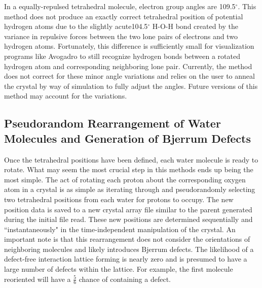 In a equally-repulsed tetrahedral molecule, electron group angles are 109.5$^{\circ}$.
This method does not produce an exactly correct tetrahedral position of potential hydrogen atoms due to the slightly acute104.5$^{\circ}$ H-O-H bond created by the variance in repulsive forces between the two lone pairs of electrons and two hydrogen atoms.
Fortunately, this difference is sufficiently small for visualization programs like Avogadro to still recognize hydrogen bonds between a rotated hydrogen atom and corresponding neighboring lone pair. 
Currently, the method does not correct for these minor angle variations and relies on the user to anneal the crystal by way of simulation to fully adjust the angles. 
Future versions of this method may account for the variations.

\subsection{Pseudorandom Rearrangement of Water Molecules and Generation of Bjerrum Defects}

Once the tetrahedral positions have been defined, each water molecule is ready to rotate.
What may seem the most crucial step in this methods ends up being the most simple.
The act of rotating each proton about the corresponding oxygen atom in a crystal is as simple as iterating through and pseudorandomly selecting two tetrahedral positions from each water for protons to occupy.
The new position data is saved to a new crystal array file similar to the parent generated during the initial file read.
These new positions are determined sequentially and ``instantaneously" in the time-independent manipulation of the crystal.
An important note is that this rearrangement does not consider the orientations of neighboring molecules and likely introduces Bjerrum defects.
The likelihood of a defect-free interaction lattice forming is nearly zero and is presumed to have a large number of defects within the lattice. 
For example, the first molecule reoriented will have a $\frac{5}{6}$ chance of containing a defect.



